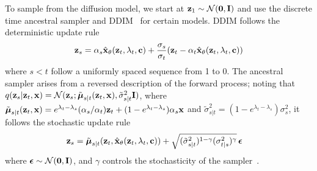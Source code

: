 To sample from the diffusion model, we start at $\mathbf{z}_1 \sim \mathcal{N}(\mathbf{0}, \mathbf{I})$ and use the discrete time ancestral sampler \citep{ho2020denoising} and DDIM~\citep{song2020denoising} for certain models. DDIM follows the deterministic update rule
\begin{align}
    \mathbf{z}_s = \alpha_s \hat{\mathbf{x}}_\theta(\mathbf{z}_t,\lambda_t,\mathbf{c}) + \frac{\sigma_s}{\sigma_t}(\mathbf{z}_t - \alpha_t\hat{\mathbf{x}}_\theta(\mathbf{z}_t,\lambda_t,\mathbf{c})) \label{eq:ddim_sampler}
\end{align}
where $s < t$ follow a uniformly spaced sequence from 1 to 0. The ancestral sampler arises from a reversed description of the forward process; noting that $q(\mathbf{z}_s|\mathbf{z}_t,\mathbf{x}) = \mathcal{N}(\mathbf{z}_s; \tilde{{\boldsymbol{\mu}}}_{s|t}(\mathbf{z}_t,\mathbf{x}), \tilde\sigma^2_{s|t}\mathbf{I})$, where
$\tilde{{\boldsymbol{\mu}}}_{s|t}(\mathbf{z}_t,\mathbf{x}) = e^{\lambda_t-\lambda_s}(\alpha_s/\alpha_t)\mathbf{z}_t + (1-e^{\lambda_t-\lambda_s})\alpha_s\mathbf{x}$ and $\tilde\sigma^2_{s|t} = (1-e^{\lambda_t-\lambda_s})\sigma_s^2$, it follows the stochastic update rule
\begin{align}
    \mathbf{z}_s &= \tilde{{\boldsymbol{\mu}}}_{s|t}(\mathbf{z}_t, \hat{\mathbf{x}}_\theta(\mathbf{z}_t,\lambda_t,\mathbf{c})) + \sqrt{(\tilde\sigma^2_{s|t})^{1-\gamma} (\sigma^2_{t|s})^\gamma}\, {\boldsymbol{\epsilon}}  \label{eq:ancestral_sampler}
\end{align}
where ${\boldsymbol{\epsilon}} \sim \mathcal{N}(\mathbf{0},\mathbf{I})$, and $\gamma$ controls the stochasticity of the sampler~\citep{nichol2021improved}.














